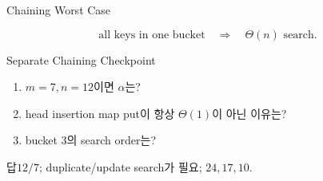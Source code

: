 \begin{frame}{Chaining Worst Case}
\centering{}
\[
\text{all keys in one bucket}\quad\Longrightarrow\quad \Theta(n)\text{ search}.
\]
\end{frame}
\begin{frame}{Separate Chaining Checkpoint}
\begin{enumerate}\item $m=7,n=12$이면 $\alpha$는?\item head insertion map put이 항상 $\Theta(1)$이 아닌 이유는?\item bucket 3의 search order는?\end{enumerate}
\begin{exampleblock}{답}$12/7$; duplicate/update search가 필요; $24,17,10$.\end{exampleblock}
\end{frame}
